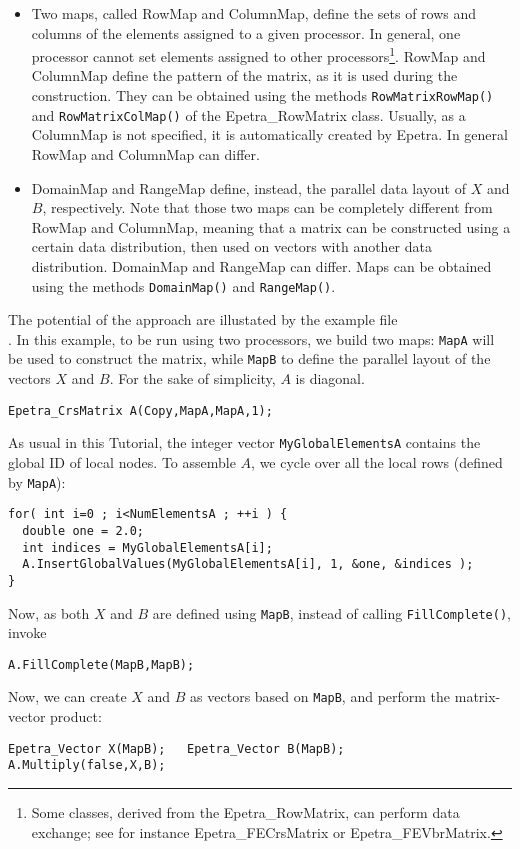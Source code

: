 \begin{itemize}
\item Two maps, called RowMap and ColumnMap, define the sets of rows and
  columns of the elements assigned to a given processor. In general, one
  processor cannot set elements assigned to other
  processors\footnote{Some classes, derived from the Epetra\_RowMatrix,
    can perform data exchange; see for instance Epetra\_FECrsMatrix or
    Epetra\_FEVbrMatrix.}. RowMap and ColumnMap define the pattern of
  the matrix, as it is used during the construction. They can be
  obtained using the methods \verb!RowMatrixRowMap()!  and
  \verb!RowMatrixColMap()! of the Epetra\_RowMatrix class. Usually, as a
  ColumnMap is not specified, it is automatically created by Epetra.  In
  general RowMap and ColumnMap can differ.
\item DomainMap and RangeMap define, instead, the parallel data layout
  of $X$ and $B$, respectively. Note that those two maps can be
  completely different from RowMap and ColumnMap, meaning that a matrix
  can be constructed using a certain data distribution, then used on
  vectors with another data distribution. DomainMap and RangeMap can
  differ.  Maps can be obtained using the methods \verb!DomainMap()! and
  \verb!RangeMap()!.
\end{itemize}
The potential of the approach are illustated by the example file\\
. In this example, to be run using two
processors, we build two maps: \verb!MapA! will be used to construct the
matrix, while \verb!MapB! to define the parallel layout of the vectors
$X$ and $B$. For the sake of simplicity, $A$ is diagonal.
\begin{verbatim}
Epetra_CrsMatrix A(Copy,MapA,MapA,1);
\end{verbatim}
As usual in this Tutorial, the integer vector \verb!MyGlobalElementsA!
contains the global ID of local nodes. To assemble $A$, we cycle over
all the local rows (defined by \verb!MapA!):
\begin{verbatim}
for( int i=0 ; i<NumElementsA ; ++i ) {
  double one = 2.0;
  int indices = MyGlobalElementsA[i];
  A.InsertGlobalValues(MyGlobalElementsA[i], 1, &one, &indices );
}
\end{verbatim}
Now, as both $X$ and $B$ are defined using \verb!MapB!, instead of
calling \verb!FillComplete()!, invoke
\begin{verbatim}
A.FillComplete(MapB,MapB);
\end{verbatim}
Now, we can create $X$ and $B$ as vectors based on \verb!MapB!, and
perform the matrix-vector product:
\begin{verbatim}
Epetra_Vector X(MapB);   Epetra_Vector B(MapB);  
A.Multiply(false,X,B);
\end{verbatim}  

